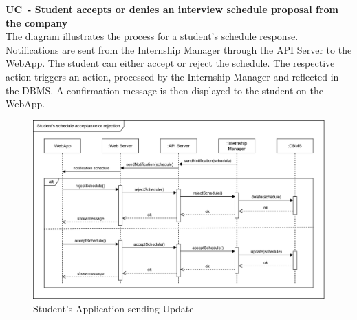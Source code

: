 \textbf{UC\cuc\ - Student accepts or denies an interview schedule proposal from the company} \\
The diagram illustrates the process for a student's schedule response. Notifications are sent from the Internship Manager through the API Server to the WebApp. The student can either accept or reject the schedule. The respective action triggers an action, processed by the Internship Manager and reflected in the DBMS. A confirmation message is then displayed to the student on the WebApp.
\begin{center}
    \begin{figure}[H]
        \centering
        \includegraphics[width=1\linewidth]{Images/Sequence diagrams/UC8.png}
        \caption{Student's Application sending Update}
        \label{fig:enter-label}
    \end{figure}
\end{center}

